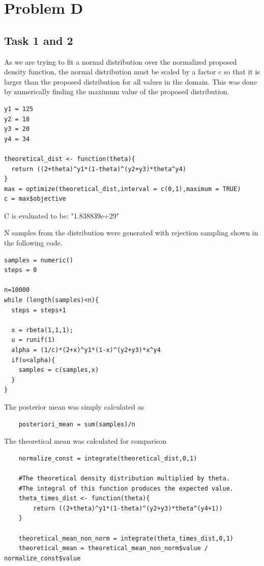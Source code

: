 \section{Problem D}
\subsection{Task 1 and 2}

As we are trying to fit a normal distribution over the normalized proposed density function, the normal distribution must be scaled by a factor c so that it is larger than the proposed distribution for all values in the domain. This was done by numerically finding the maximum value of the proposed distribution. 

\begin{lstlisting}
y1 = 125
y2 = 18
y3 = 20
y4 = 34

theoretical_dist <- function(theta){
  return ((2+theta)^y1*(1-theta)^(y2+y3)*theta^y4)
}
max = optimize(theoretical_dist,interval = c(0,1),maximum = TRUE)
c = max$objective
\end{lstlisting}

C is evaluated to be: "1.838839e+29"

N samples from the distribution were generated with rejection sampling shown in the following code.

\begin{lstlisting}
samples = numeric()
steps = 0

n=10000
while (length(samples)<n){
  steps = steps+1
  
  x = rbeta(1,1,1);
  u = runif(1)
  alpha = (1/c)*(2+x)^y1*(1-x)^(y2+y3)*x^y4
  if(u<alpha){
    samples = c(samples,x)
  }
}
\end{lstlisting}

The posterior mean was simply calculated as

\begin{lstlisting}
    posteriori_mean = sum(samples)/n
\end{lstlisting}

The theoretical mean was calculated for comparison


\begin{lstlisting}
    normalize_const = integrate(theoretical_dist,0,1)
    
    #The theoretical density distribution multiplied by theta. 
    #The integral of this function produces the expected value.
    theta_times_dist <- function(theta){
        return ((2+theta)^y1*(1-theta)^(y2+y3)*theta^(y4+1))
    }

    theoretical_mean_non_norm = integrate(theta_times_dist,0,1)
    theoretical_mean = theoretical_mean_non_norm$value / normalize_const$value
\end{lstlisting}

